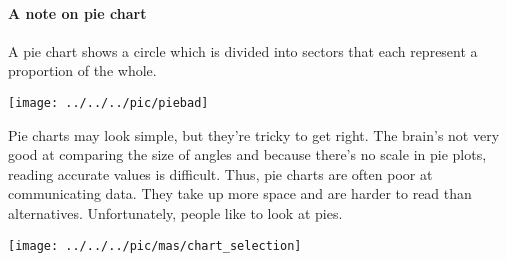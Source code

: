 \paragraph{A note on pie chart} 
A pie chart shows a circle which is divided into
sectors that each represent a proportion of the whole.
\begin{center}
	\texttt{[image: ../../../pic/piebad]}
\end{center}
Pie charts may look simple, but they’re tricky to get right.
The brain's not very good at comparing the size of angles and because there's no scale in pie plots, reading accurate values is difficult. Thus, pie charts are often poor at communicating data. They take up more space and are harder to read than alternatives. Unfortunately, people like to look at pies. 


\begin{center}
\texttt{[image: ../../../pic/mas/chart\_selection]}
\end{center}





